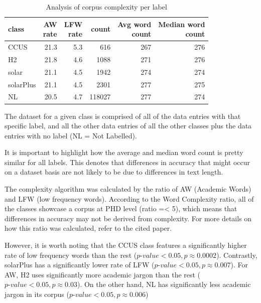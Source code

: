 \documentclass[11pt]{article}
\begin{document}
\begin{table}
  \centering
    \begin{tabular}{lrrrrr}
      \hline
      class & \thead{AW \\ rate} & \thead{LFW \\ rate} & count & \thead{Avg word \\ count} & \thead{Median word \\ count} \\
      \hline
      CCUS & 21.3 & 5.3 & 616 & 267 & 276 \\
      H2 & 21.8 & 4.6 & 1088 & 271 & 276 \\
      solar & 21.1 & 4.5 & 1942 & 274 & 274 \\
      solarPlus & 21.1 & 4.5 & 2301 & 277 & 275 \\
      NL & 20.5 & 4.7 & 118027 & 277 & 274 \\
      \hline
    \end{tabular}
    \caption{Analysis of corpus complexity per label}
    \label{table:classDesc}
\end{table}
The dataset for a given class is comprised of all of the data entries with that specific label, and all the other data entries of all the other classes plus the data entries with no label (NL = Not Labelled). 

It is important to highlight how the average and median word count is pretty similar for all labels. This denotes that differences in accuracy that might occur on a dataset basis are not likely to be due to differences in text length.

The complexity algorithm was calculated by the ratio of AW (Academic Words) and LFW (low frequency words)\cite{Ferlatti}.
According to the Word Complexity ratio, all of the classes showcase a corpus at PHD level (ratio =< 5),
which means that differences in accuracy may not be derived from complexity. For more details on how this ratio was calculated, refer to the cited paper.

However, it is worth noting that the CCUS class features a significantly higher rate of low frequency words than the rest ($\textit{p-value} < 0.05, p \approx 0.0002$). Contrastly, solarPlus has a significantly lower rate of LFW ($\textit{p-value} < 0.05, p \approx 0.007$).
For AW, H2 uses significantly more academic jargon than the rest ($\textit{p-value} < 0.05, p \approx 0.03$). On the other hand, NL has significantly less academic jargon in its corpus ($\textit{p-value} < 0.05, p \approx 0.006$)
\end{document}
